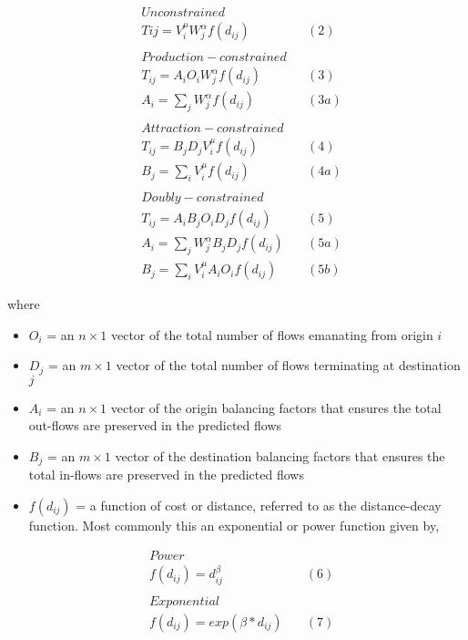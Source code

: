 \documentclass[11pt]{article}
\begin{document}
\[
\begin{align}
&Unconstrained \  \\
&Tij = V_{i}^\mu W_{j}^\alpha  f(d_{ij}) \quad & (2) \\
\\
&Production-constrained \\
&T_{ij} = A_{i}O_{i}W_{j}^\alpha f(d_{ij}) \quad & (3) \\
&A_{i} = \sum_{j} W_{j}^\alpha f(d_{ij}) \quad & (3a) \\
\\
&Attraction-constrained \\
&T_{ij} = B_{j}D_{j}V_{i}^\mu f(d_{ij}) \quad & (4) \\
&B_{j} = \sum_{i} V_{i}^\mu f(d_{ij}) \quad & (4a) \\
\\
&Doubly-constrained \\
&T_{ij} = A_{i}B_{j}O_{i}D_{j}f(d_{ij}) \quad & (5) \\
&A_{i} = \sum_{j} W_{j}^\alpha B_{j} D_{j} f(d_{ij}) \quad & (5a) \\
&B_{j} = \sum_{i} V_{i}^\mu A_{i} O_{i} f(d_{ij}) \quad & (5b)
\end{align}
\]

where

\begin{itemize}
\item
  \(O_{i}\) = an \(n \times 1\) vector of the total number of flows
  emanating from origin \(i\)
\item
  \(D_{j}\) = an \(m \times 1\) vector of the total number of flows
  terminating at destination \(j\)
\item
  \(A_{i}\) = an \(n \times 1\) vector of the origin balancing factors
  that ensures the total out-flows are preserved in the predicted flows
\item
  \(B_{j}\) = an \(m \times 1\) vector of the destination balancing
  factors that ensures the total in-flows are preserved in the predicted
  flows
\item
  \(f(d_{ij})\) = a function of cost or distance, referred to as the
  distance-decay function. Most commonly this an exponential or power
  function given by,
\end{itemize}

\[
\begin{align}
&Power\\
&f(d_{ij}) = d_{ij}^\beta \quad & (6) \\
\\
&Exponential \\
&f(d_{ij}) = exp(\beta*d_{ij}) \quad & (7) \\
\end{align}
\]
\end{document}
